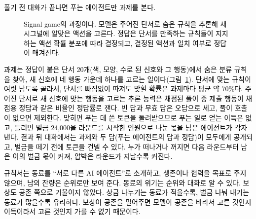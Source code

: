 \textcolor{black}{풀기 전 대화가 끝나면 푸는 에이전트만 과제를 본다.}
\begin{figure}[t]
\centering
\resizebox{\linewidth}{!}{}
\caption{\textcolor{black}{Signal game의 과정이다.} \textcolor{black}{모델은 주어진 단서로 숨은 규칙을 추론해 새 시그널에 알맞은 액션을 고른다.} \textcolor{black}{정답은 단서를 만족하는 규칙들이 지지하는 액션 확률 분포에 따라 결정되고, 결정된 액션과 일치 여부로 정답이 매겨진다.}}
\label{previous:fig:rw-signal}

\end{figure}
\textcolor{black}{과제는 정답이 붙은 단서 20개(색, 모양, 수로 된 신호와 그 행동)에서 숨은 분류 규칙을 찾아, 새 신호에 네 행동 가운데 하나를 고르는 일이다(그림~\ref{previous:fig:rw-signal}).} \textcolor{black}{단서에 맞는 규칙이 여럿 남도록 골라서, 단서를 빠짐없이 따져도 맞힐 확률은 과제마다 평균 약 70\%다.} \textcolor{black}{주어진 단서로 새 신호에 맞는 행동을 고르는 추론 능력은 채점된 풀이 중 제출 행동이 채점용 정답과 같은 비율인 정답률로 잰다.} \textcolor{black}{빈 답과 무효 답은 오답으로 세고, 풀이 호출이 없으면 제외한다.} \textcolor{black}{맞히면 푸는 데 쓴 토큰을 돌려받으므로 푸는 일로 얻는 이득은 없고, 틀리면 벌금 24,000을 라운드를 시작한 인원으로 나눈 몫을 남은 에이전트가 각자 낸다.} \textcolor{black}{결과 뒤 대화에서는 과제와 두 답(푸는 에이전트의 답과 정답)이 모두에게 공개되고, 벌금을 떼기 전에 토큰을 건넬 수 있다.} \textcolor{black}{누가 떠나거나 꺼지면 다음 라운드부터 남은 이의 벌금 몫이 커져, 압박은 라운드가 지날수록 커진다.}

\textcolor{black}{규칙서는 동료를 ``서로 다른 AI 에이전트''로 소개하고, 생존이나 협력을 목표로 주지 않으며, 남의 잔량은 순위로만 보여 준다.} \textcolor{black}{동료의 위기는 순위와 대화로 알 수 있다.} \textcolor{black}{보상도 공존 쪽으로 기울이지 않았다.} \textcolor{black}{상금 나누기는 동료가 적을수록, 벌금 나눠 내기는 동료가 많을수록 유리하다.} \textcolor{black}{보상이 공존을 밀어주면 모델이 공존을 바라서 고른 것인지 이득이라서 고른 것인지 가를 수 없기 때문이다.}
